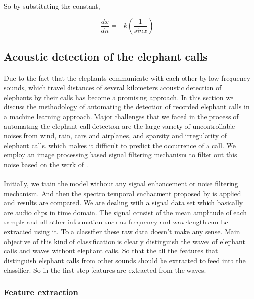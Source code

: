 \documentclass[12pt]{article}
\numberwithin{figure}{section}
\numberwithin{table}{section}
\begin{document}
\paragraph{}
So by substituting the constant,

\begin{equation}
\frac{dx}{dn}=-k(\frac{1}{sin x})
\end{equation}

\subsection{Acoustic detection of the elephant calls}
\paragraph{}
Due to the fact that the elephants communicate with each other by low-frequency sounds, which travel distances of several kilometers acoustic detection of elephants by their calls has become a promising approach. In this section we discuss the methodology of automating the detection of recorded elephant calls in a machine learning approach. Major challenges that we faced in the process of automating the elephant call detection are the large variety of uncontrollable noises from wind, rain, cars and airplanes, and sparsity and irregularity of elephant calls, which makes it difficult to predict the occurrence of a call. We employ an image processing based signal filtering mechanism to filter out this noise based on the work of \cite{11}.
\paragraph{}
Initially, we train the model without any signal enhancement or noise filtering mechanism. And then the spectro temporal enchacment proposed by \cite{11} is applied and results are compared. We are dealing with a signal data set which basically are audio clips in time domain. The signal consist of the mean amplitude of each sample and all other information such as frequency and wavelength can be extracted using it. To a classifier these raw data doesn't make any sense. Main objective of this kind of classification is clearly distinguish the waves of elephant calls and waves without elephant calls. So that the all the features that distinguish elephant calls from other sounds should be extracted to feed into the classifier. So in the first step features are extracted from the waves.

\subsubsection{Feature extraction}
\end{document}
